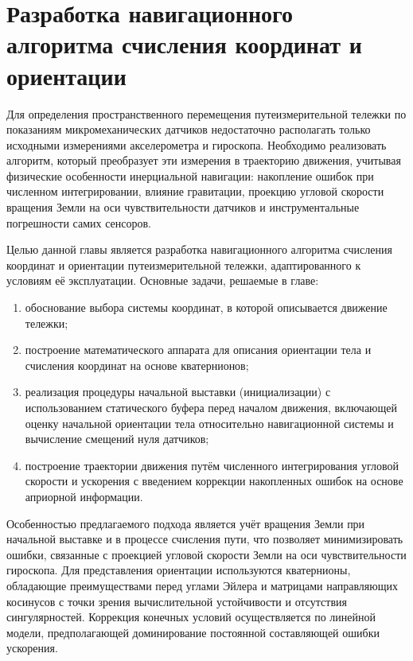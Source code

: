 \chapter{Разработка навигационного алгоритма счисления координат и ориентации}
\label{chap:navigation}


Для определения пространственного перемещения путеизмерительной тележки по показаниям микромеханических датчиков недостаточно располагать только исходными измерениями акселерометра и гироскопа. Необходимо реализовать алгоритм, который преобразует эти измерения в траекторию движения, учитывая физические особенности инерциальной навигации: накопление ошибок при численном интегрировании, влияние гравитации, проекцию угловой скорости вращения Земли на оси чувствительности датчиков и инструментальные погрешности самих сенсоров.

Целью данной главы является разработка навигационного алгоритма счисления координат и ориентации путеизмерительной тележки, адаптированного к условиям её эксплуатации. Основные задачи, решаемые в главе:

\begin{enumerate}
	\item обоснование выбора системы координат, в которой описывается движение тележки;
	\item построение математического аппарата для описания ориентации тела и счисления координат на основе кватернионов;
	\item реализация процедуры начальной выставки (инициализации) с использованием статического буфера перед началом движения, включающей оценку начальной ориентации тела относительно навигационной системы и вычисление смещений нуля датчиков;
	\item построение траектории движения путём численного интегрирования угловой скорости и ускорения с введением коррекции накопленных ошибок на основе априорной информации.
\end{enumerate}

Особенностью предлагаемого подхода является учёт вращения Земли при начальной выставке и в процессе счисления пути, что позволяет минимизировать ошибки, связанные с проекцией угловой скорости Земли на оси чувствительности гироскопа. Для представления ориентации используются кватернионы, обладающие преимуществами перед углами Эйлера и матрицами направляющих косинусов с точки зрения вычислительной устойчивости и отсутствия сингулярностей. Коррекция конечных условий осуществляется по линейной модели, предполагающей доминирование постоянной составляющей ошибки ускорения.


